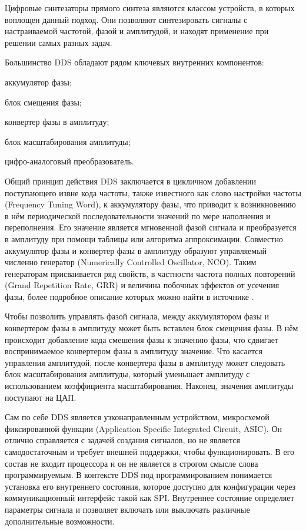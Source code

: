 \documentclass{report}
\begin{document}
Цифровые синтезаторы прямого синтеза являются классом устройств, в которых воплощен данный подход. Они позволяют синтезировать сигналы с настраиваемой частотой, фазой и амплитудой, и находят применение при решении самых разных задач.

Большинство DDS обладают рядом ключевых внутренних компонентов:

\begin{enummarker}
    \item аккумулятор фазы;
    \item блок смещения фазы;
    \item конвертер фазы в амплитуду;
    \item блок масштабирования амплитуды;
    \item цифро-аналоговый преобразователь.
\end{enummarker}

Общий принцип действия DDS заключается в цикличном добавлении поступающего извне кода частоты, также известного как слово настройки частоты (Frequency Tuning Word), к аккумулятору фазы, что приводит к возникновению в нём периодической последовательности значений по мере наполнения и переполнения. Его значение является мгновенной фазой сигнала и преобразуется в амплитуду при помощи таблицы или алгоритма аппроксимации. Совместно аккумулятор фазы и конвертер фазы в амплитуду образуют управляемый численно генератор (Numerically Controlled Oscillator, NCO). Таким генераторам присваивается ряд свойств, в частности частота полных повторений (Grand Repetition Rate, GRR) и величина побочных эффектов от усечения фазы, более подробное описание которых можно найти в источнике \cite{dds_tutorial}.

Чтобы позволить управлять фазой сигнала, между аккумулятором фазы и конвертером фазы в амплитуду может быть вставлен блок смещения фазы. В нём происходит добавление кода смешения фазы к значению фазы, что сдвигает воспринимаемое конвертером фазы в амплитуду значение. Что касается управления амплитудой, после конвертера фазы в амплитуду может следовать блок масштабирования амплитуды, который уменьшает амплитуду с использованием коэффициента масштабирования. Наконец, значения амплитуды поступают на ЦАП.

Сам по себе DDS является узконаправленным устройством, микросхемой фиксированной функции (Application Specific Integrated Circuit, ASIC). Он отлично справляется с задачей создания сигналов, но не является самодостаточным и требует внешней поддержки, чтобы функционировать. В его состав не входит процессора и он не является в строгом смысле слова программируемым. В контексте DDS под программированием понимается установка его внутреннего состояния, которое доступно для конфигурации через коммуникационный интерфейс такой как SPI. Внутреннее состояние определяет параметры сигнала и позволяет включать или выключать различные дополнительные возможности.
\end{document}
